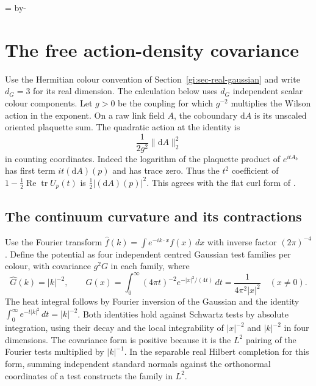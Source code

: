 \documentclass[11pt,letterpaper,reqno]{amsart}
\numberwithin{equation}{section}
\newcommand{\gineedspace}[1]{\par\begingroup
  \dimen0=\pagegoal\advance\dimen0 by-\pagetotal
  \ifdim\dimen0<#1\relax\newpage\fi\endgroup}
\theoremstyle{definition}
\theoremstyle{remark}
\begin{document}
\gineedspace{8\baselineskip}
\section{The free action-density covariance}\label{gi:sec-free-density}

Use the Hermitian colour convention of
Section~\ref{gi:sec-real-gaussian} and write \(d_G=3\)
for its real dimension. The calculation below
uses \(d_G\) independent scalar colour components. Let \(g>0\)
be the coupling for which \(g^{-2}\) multiplies the Wilson
action in the exponent. On a raw link field \(A\), the
coboundary \(\mathrm d A\) is its unscaled oriented plaquette sum.
The quadratic action at the identity is
\[
                    \frac1{2g^2}\|\mathrm d A\|_2^2
\]
in counting coordinates. Indeed the logarithm of the
plaquette product of \(e^{itA_b}\) has first term
\(it(\mathrm d A)(p)\) and has trace zero. Thus the
\(t^2\) coefficient of \(1-\tfrac12\operatorname{Re}\operatorname{tr}U_p(t)\)
is \(\tfrac12|(\mathrm d A)(p)|^2\). This agrees with the
flat curl form of \cite[eqs.~(3.10)--(3.12), p.~392]{Bal85p}.

\subsection{The continuum curvature and its contractions}

Use the Fourier transform \(\widehat f(k)=\int e^{-ik\cdot x}f(x)\,dx\)
with inverse factor \((2\pi)^{-4}\). Define the potential as four
independent centred Gaussian test families per colour, with
covariance \(g^2 G\) in each family, where
\[
 \widehat G(k)=|k|^{-2},\qquad
 G(x)=\int_0^\infty(4\pi t)^{-2}e^{-|x|^2/(4t)}\,dt
                         =\frac1{4\pi^2|x|^2}\quad(x\ne0).
\]
The heat integral follows by Fourier inversion of the Gaussian
and the identity \(\int_0^\infty e^{-t|k|^2}\,dt=|k|^{-2}\).
Both identities hold against Schwartz tests by absolute
integration, using their decay and the local integrability
of \(|x|^{-2}\) and \(|k|^{-2}\) in four dimensions.
The covariance form is positive
because it is the \(L^2\) pairing of the Fourier tests multiplied
by \(|k|^{-1}\). In the separable real Hilbert completion for
this form, summing independent standard normals against the
orthonormal coordinates of a test constructs the family in
\(L^2\).
\end{document}
